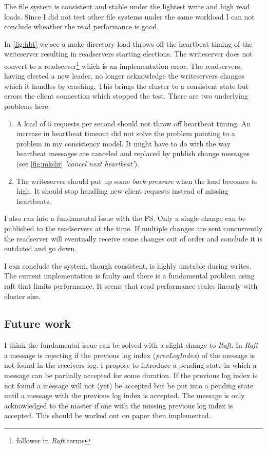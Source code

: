 The file system is consistent and stable under the lightest write and high read loads. Since I did not test other file systems under the same workload I can not conclude wheather the read performance is good. 

In \cref{fig:hbt} we see a make directory load throws off the heartbeat timing of the writeserver resulting in readservers starting elections. The writeserver does not convert to a readserver\footnote{follower in \textit{Raft} terms} which is an implementation error. The readservers, having elected a new leader, no longer acknowledge the writeservers changes which it handles by crashing. This brings the cluster to a consistent state but errors the client connection which stopped the test. 
There are two underlying problems here:

\begin{enumerate}
	\item A load of $5$ requests per second should not throw off heartbeat timing. An increase in heartbeat timeout did not solve the problem pointing to a problem in my consistency model. It might have to do with the way heartbeat messages are canceled and replaced by publish change messages (see \cref{fig:mkdir} \textit{'cancel next heartbeat'}).
	\item The writeserver should put up some \textit{back-pressure} when the load becomes to high. It should stop handling new client requests instead of missing heartbeats.
\end{enumerate}

I also ran into a fundamental issue with the FS. Only a single change can be published to the readservers at the time. If multiple changes are sent concurrently the readserver will eventually receive some changes out of order and conclude it is outdated and go down. 

I can conclude the system, though consistent, is highly unstable during writes. The current implementation is faulty and there is a fundamental problem using raft that limits performance. It seems that read performance scales linearly with cluster size. 

\subsection{Future work}
I think the fundamental issue can be solved with a slight change to \textit{Raft}. In \textit{Raft} a message is rejecting if the previous log index (\textit{prevLogIndex}) of the message is not found in the receivers log. I propose to introduce a pending state in which a message can be partially accepted for some duration. If the previous log index is not found a message will not (yet) be accepted but be put into a pending state until a message with the previous log index is accepted. The message is only acknowledged to the master if one with the missing previous log index is accepted. This should be worked out on paper then implemented.

